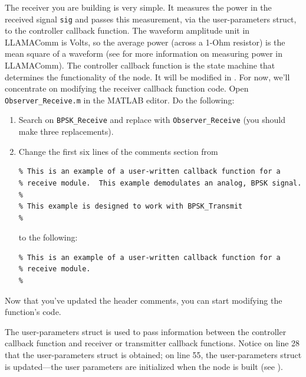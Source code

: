 The receiver you are building is very simple. It measures the power in the received signal \verb+sig+ and passes this measurement, via the user-parameters struct, to the controller callback function.  The waveform amplitude unit in LLAMAComm is Volts, so the average power (across a 1-Ohm resistor) is the mean square of a waveform (see  for more information on measuring power in LLAMAComm).  The controller callback function is the state machine that determines the functionality of the node.  It will be modified in .  For now, we'll concentrate on modifying the receiver callback function code.
Open \verb+Observer_Receive.m+ in the MATLAB editor.  Do the following:
\begin{enumerate}
\item Search on \verb+BPSK_Receive+ and replace with \verb+Observer_Receive+ (you should make three replacements).

\item Change the first six lines of the comments section from
\begin{lstlisting}[numbers=none]
% Function Observer_Receive.m:
% This is an example of a user-written callback function for a
% receive module.  This example demodulates an analog, BPSK signal.
%
% This example is designed to work with BPSK_Transmit
%
\end{lstlisting}
%
to the following:
%
\begin{lstlisting}[numbers=none]
% Function Observer_Receive.m:
% This is an example of a user-written callback function for a
% receive module.
%
\end{lstlisting}
%
\end{enumerate}
Now that you've updated the header comments, you can start modifying the function's code.

The user-parameters struct is used to pass information between the controller callback function and receiver or transmitter callback functions.  Notice on line 28 that the user-parameters struct is obtained; on line 55, the user-parameters struct is updated---the user parameters are initialized when the node is built (see ).


